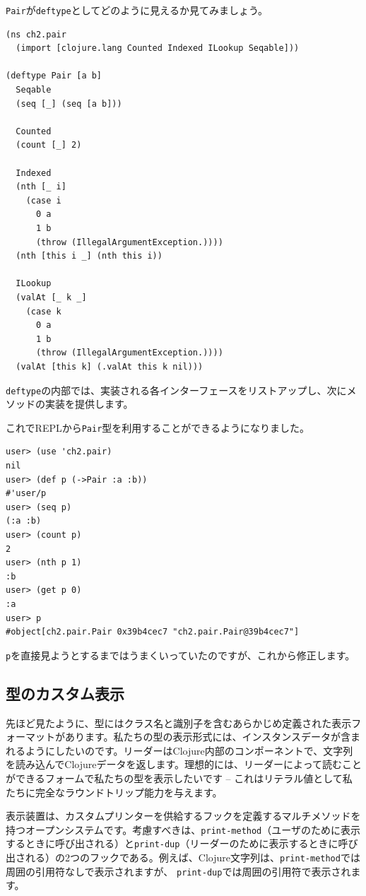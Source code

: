 \texttt{Pair}が\texttt{deftype}としてどのように見えるか見てみましょう。

\begin{lstlisting}[numbers=none]
(ns ch2.pair
  (import [clojure.lang Counted Indexed ILookup Seqable]))

(deftype Pair [a b]
  Seqable
  (seq [_] (seq [a b]))

  Counted
  (count [_] 2)

  Indexed
  (nth [_ i]
    (case i
      0 a
      1 b
      (throw (IllegalArgumentException.))))
  (nth [this i _] (nth this i))

  ILookup
  (valAt [_ k _]
    (case k
      0 a
      1 b
      (throw (IllegalArgumentException.))))
  (valAt [this k] (.valAt this k nil)))
\end{lstlisting}

\texttt{deftype}の内部では、実装される各インターフェースをリストアップし、次にメソッドの実装を提供します。

これでREPLから\texttt{Pair}型を利用することができるようになりました。

\begin{lstlisting}[numbers=none]
user> (use 'ch2.pair)
nil
user> (def p (->Pair :a :b))
#'user/p
user> (seq p)
(:a :b)
user> (count p)
2
user> (nth p 1)
:b
user> (get p 0)
:a
user> p
#object[ch2.pair.Pair 0x39b4cec7 "ch2.pair.Pair@39b4cec7"]
\end{lstlisting}

\texttt{p}を直接見ようとするまではうまくいっていたのですが、これから修正します。

\subsection{型のカスタム表示}

先ほど見たように、型にはクラス名と識別子を含むあらかじめ定義された表示フォーマットがあります。私たちの型の表示形式には、インスタンスデータが含まれるようにしたいのです。リーダーはClojure内部のコンポーネントで、文字列を読み込んでClojureデータを返します。理想的には、リーダーによって読むことができるフォームで私たちの型を表示したいです -- これはリテラル値として私たちに完全なラウンドトリップ能力を与えます。

表示装置は、カスタムプリンターを供給するフックを定義するマルチメソッドを持つオープンシステムです。考慮すべきは、\texttt{print-method}（ユーザのために表示するときに呼び出される）と\texttt{print-dup}（リーダーのために表示するときに呼び出される）の2つのフックである。例えば、Clojure文字列は、\texttt{print-method}では周囲の引用符なしで表示されますが、 \texttt{print-dup}では周囲の引用符で表示されます。

